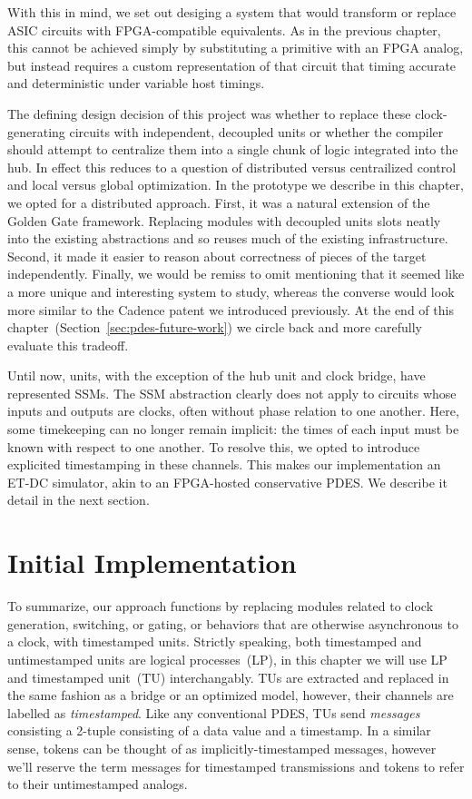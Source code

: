With this in mind, we set out desiging a system that would transform or replace
ASIC circuits with FPGA-compatible equivalents. As in the previous chapter,
this cannot be achieved simply by substituting a primitive with an FPGA analog,
but instead requires a custom representation of that circuit that timing
accurate and deterministic under variable host timings.

The defining design decision of this project was whether to replace
these clock-generating circuits with independent, decoupled units or whether
the compiler should attempt to centralize them into a single chunk of logic
integrated into the hub. In effect this reduces to a question of distributed
versus centrailized control and local versus global optimization. In the
prototype we describe in this chapter, we opted for a distributed approach.
First, it was a natural extension of the Golden Gate framework. Replacing
modules with decoupled units slots neatly into the existing abstractions and so
reuses much of the existing infrastructure. Second, it made it easier to reason
about correctness of pieces of the target independently. Finally, we would be
remiss to omit mentioning that it seemed like a more unique and interesting
system to study, whereas the converse would look more similar to the Cadence
patent we introduced previously. At the end of this chapter~(Section~\ref{sec:pdes-future-work}) we
circle back and more carefully evaluate this tradeoff.


Until now, units, with the exception of the hub unit and clock bridge, have
represented SSMs. The SSM abstraction clearly does not apply to circuits whose
inputs and outputs are clocks, often without phase relation to one another.
Here, some timekeeping can no longer remain implicit: the times of each input
must be known with respect to one another. To resolve this, we opted to
introduce explicited timestamping in these channels. This makes our
implementation an ET-DC simulator, akin to an FPGA-hosted conservative PDES. We
describe it detail in the next section.

\section{Initial Implementation}

To summarize, our approach functions by replacing modules
related to clock generation, switching, or gating, or behaviors that are
otherwise asynchronous to a clock, with timestamped units. Strictly speaking,
both timestamped and untimestamped units are logical processes~(LP), in this
chapter we will use LP and timestamped unit~(TU) interchangably. TUs are
extracted and replaced in the same fashion as a bridge or an optimized model,
however, their channels are labelled as \emph{timestamped}. Like any
conventional PDES, TUs send \emph{messages} consisting a 2-tuple consisting of
a data value and a timestamp.  In a similar sense, tokens can be thought of as
implicitly-timestamped messages, however we'll reserve the term messages for
timestamped transmissions and tokens to refer to their untimestamped
analogs.


